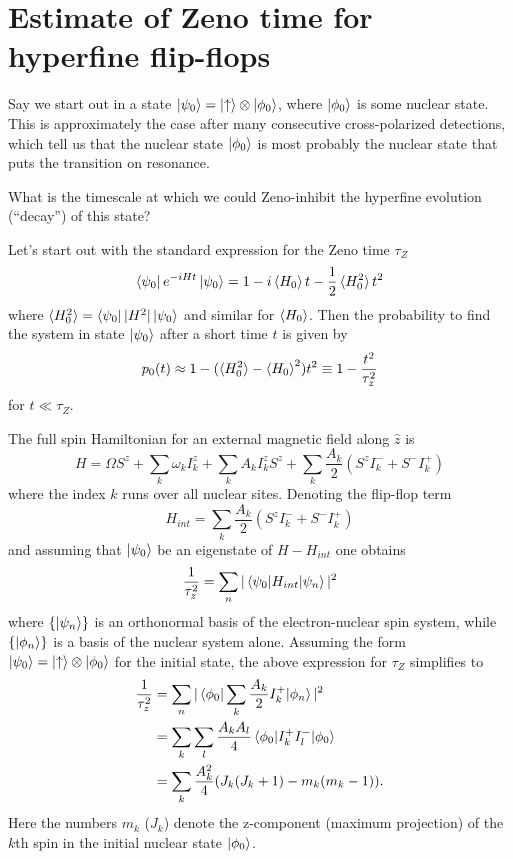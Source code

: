 \documentclass[aps, pra, amsfonts, a4paper, showpacs]{revtex4-1}
\begin{document}
\newcommand{\kpz}{\ket{\psi_0}}
\newcommand{\bpz}{\bra{\psi_0}}
\newcommand{\hz}{\braket{H_0}}
\newcommand{\hsqz}{\braket{H^2_0}}

\section*{Estimate of Zeno time for hyperfine flip-flops}

Say we start out in a state $\ket{\psi_0}=\ket{\uparrow}\otimes\ket{\phi_0}$, where $\ket{\phi_0}$ is some nuclear state. This is approximately the case after many consecutive cross-polarized detections, which tell us that the nuclear state $\ket{\phi_0}$ is most probably the nuclear state that puts the transition on resonance. 

What is the timescale at which we could Zeno-inhibit the hyperfine evolution (``decay'') of this state? 

\vspace{0.5cm}
Let's start out with the standard expression for the Zeno time $\tau_Z$ \cite{pascazio_all_2014}
\[
\bpz e^{-i H t} \kpz = 1 - i\hz t -\frac{1}{2} \hsqz t^2
\]
where $ \hsqz = \bpz | H^2 | \kpz$ and similar for $\hz$.
Then the probability to find the system in state $\kpz$ after a short time $t$ is given by
\begin{equation}
p_0(t) \approx 1- (\hsqz - \hz^2)t^2 \equiv 1- \frac{t^2}{\tau_z^2} 
\label{Eq: p0}
\end{equation}
for $t \ll \tau_Z$.

The full spin Hamiltonian for an external magnetic field along $\hat{z}$ is
\begin{equation}
H=\Omega S^z + \sum_k \omega_k I^z_k + \sum_k A_k I^z_k S^z + \sum_k \frac{A_k}{2}(S^zI^-_k + S^- I_k^+)
\label{Eq: H}
\end{equation}
where the index $k$ runs over all nuclear sites. Denoting the flip-flop term
\[H_{int} = \sum_k \frac{A_k}{2}(S^zI^-_k + S^- I_k^+) \]
and assuming that $\kpz$ be an eigenstate of $H-H_{int}$ one obtains
\begin{equation}
\frac{1}{\tau_z^2} = \sum_n |\braket{\psi_0|H_{int}|\psi_n}|^2
\label{Eq: simp}
\end{equation}
where $\{\ket{\psi_n}\}$ is an orthonormal basis of the electron-nuclear spin system, while $\{\ket{\phi_n}\}$ is a basis of the nuclear system alone.
Assuming the form $\ket{\psi_0}=\ket{\uparrow}\otimes\ket{\phi_0}$ for the initial state, the above expression for $\tau_Z$ simplifies to
\begin{equation}
\begin{split}
\frac{1}{\tau_z^2} &=\sum_n |\braket{\phi_0 | \sum_k \frac{A_k}{2} I_k^+ |\phi_n}|^2 \\
&= \sum_k \sum_l \frac{A_k A_l}{4}\braket{\phi_0 | I_k^+ I_l^- |\phi_0} \\
&= \sum_k \frac{A_k^2}{4}(J_k(J_k+1) - m_k(m_k -1)).
\end{split}
\end{equation}
Here the numbers $m_k$ ($J_k$) denote the z-component (maximum projection) of the $k$th spin in the initial nuclear state $\ket{\phi_0}$.
\end{document}
